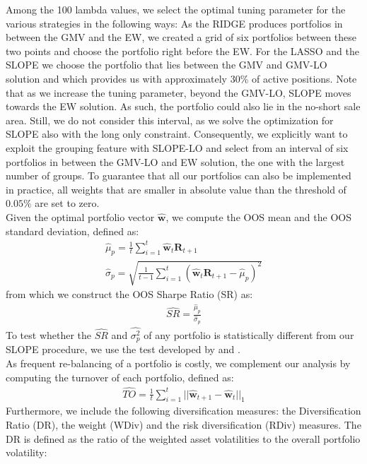 \documentclass[12pt, a4paper]{article}
\newcommand{\bfw}{\boldsymbol{w} }
\begin{document}
Among the 100 lambda values, we select the optimal tuning parameter for the various strategies in the following ways: As the RIDGE produces portfolios in between the GMV and the EW, we created a grid of six portfolios between these two points and choose the portfolio right before the EW. For the LASSO and the SLOPE we choose the portfolio that lies between the GMV and GMV-LO solution and which provides us with approximately 30\% of active positions. Note that as we increase the tuning parameter, beyond the GMV-LO, SLOPE moves towards the EW solution. As such, the portfolio could also lie in the no-short sale area. Still, we do not consider this interval, as we solve the optimization for SLOPE also with the long only constraint. Consequently, we explicitly want to exploit the grouping feature with SLOPE-LO and select from an interval of six portfolios in between the GMV-LO and EW solution, the one with the largest number of groups. To guarantee that all our portfolios can also be implemented in practice, all weights that are smaller in absolute value than the threshold of $0.05\%$ are set to zero.\\
Given the optimal portfolio vector $\hat{\boldsymbol{w}}$, we compute the OOS mean and the OOS standard deviation, defined as:
%
\begin{gather}
\hat{\mu}_{p} = \frac{1}{t} \sum_{i=1}^{t} \hat{\bfw}_{t} \boldsymbol{R}_{t+1} \\
\hat{\sigma}_{p} = \sqrt{\frac{1}{t-1} \sum_{i=1}^{t} (\hat{\bfw}_{t} \boldsymbol{R}_{t+1} - \hat{\mu}_{p})^{2}}
\end{gather}
%
from which we construct the OOS Sharpe Ratio (SR) as:
\begin{gather}
\widehat{SR} = \frac{\hat{\mu}_{p}}{\hat{\sigma}_{p}}
\end{gather}
To test whether the $\widehat{SR}$ and $\widehat{\sigma_{p}^{2}}$ of any portfolio is statistically different from our SLOPE procedure, we use the test developed by \cite{Ledoit2008} and \cite{Ledoit2011}.\\
As frequent re-balancing of a portfolio is costly, we complement our analysis by computing the turnover of each portfolio, defined as:
\begin{gather}
\widehat{TO} = \frac{1}{t} \sum_{i=1}^{t} ||\hat{\bfw}_{t+1}- \hat{\bfw}_{t}||_{1}
\end{gather}
Furthermore, we include the following diversification measures: the Diversification Ratio (DR), the weight (WDiv) and the risk diversification (RDiv) measures.
The DR is defined as the ratio of the weighted asset volatilities to the overall portfolio volatility:
\end{document}
